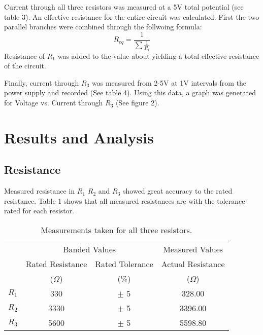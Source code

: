 \documentclass[CMPE]{KGCOEReport}
\begin{document}
Current through all three resistors was measured at a 5V total potential (see table 3). An effective resistance for the entire circuit was calculated. First the two parallel branches were combined through the follwoing formula:
\[
R_{eq} = \frac{1}{ \sum\frac{1}{R_i} }
\]
Resistance of $R_1$ was added to the value about yielding a total effective resistance of the circuit.  

Finally, current through $R_3$ was measured from 2-5V at 1V intervals from the power supply and recorded (See table 4). Using this data, a graph was generated for Voltage vs. Current through $R_3$ (See figure 2).

\section*{Results and Analysis}
\subsection*{Resistance}
Measured resistance in $R_1$ $R_2$ and $R_3$ showed great accuracy to the rated resistance. Table 1 shows that all measured resistances are with the tolerance rated for each resistor.


\begin{table}[h]
\caption{Measurements taken for all three resistors.}
\begin{center}
\begin{tabular}{cc|c|c}
& \multicolumn{2}{c}{Banded Values} & Measured Values  \\\cline{2-4}
\multirow{2}{*}{}
& Rated Resistance & Rated Tolerance & Actual Resistance \\
& ($\Omega$) & (\%) & ($\Omega$) \\\cline{2-4}
$R_1$ & 330 & $\pm$ 5 & 328.00 \\\cline{2-4}
$R_2$ & 3330 & $\pm$ 5 & 3396.00 \\\cline{2-4}
$R_3$ & 5600 & $\pm$ 5 & 5598.80 \\\cline{2-4}
\end{tabular}
\end{center}
\end{table}
\end{document}
